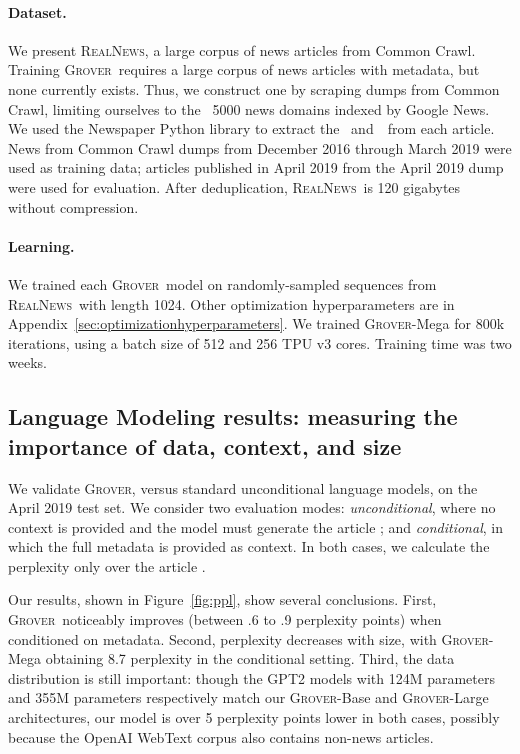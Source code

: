 \documentclass{article}
\newcommand{\modelname}{{\textsc{Grover}}}
\newcommand{\datasetname}{{\textsc{RealNews}}}
\begin{document}
\paragraph{Dataset.} We present \datasetname, a large corpus of news articles from Common Crawl. Training \modelname~requires a large corpus of news articles with metadata, but none currently exists. Thus, we construct one by scraping dumps from Common Crawl, limiting ourselves to the ~5000 news domains indexed by Google News. We used the Newspaper Python library to extract the \bodyfield~and~\metadata~from each article. News from Common Crawl dumps from December 2016 through March 2019 were used as training data; articles published in April 2019 from the April 2019 dump were used for evaluation. After deduplication, \datasetname~is 120 gigabytes without compression.


\paragraph{Learning.} We trained each \modelname~model on randomly-sampled sequences from \datasetname~with length 1024. Other optimization hyperparameters are in Appendix~\ref{sec:optimizationhyperparameters}. We trained \modelname-Mega for 800k iterations, using a batch size of 512 and 256 TPU v3 cores.
Training time was two weeks.

\subsection{Language Modeling results: measuring the importance of data, context, and size}
We validate \modelname, versus standard unconditional language models, on the  April 2019 test set. We consider two evaluation modes: \emph{unconditional}, where no context is provided and the model must generate the article \bodyfield; and \emph{conditional}, in which the full metadata is provided as context. In both cases, we calculate the perplexity only over the article \bodyfield.

Our results, shown in Figure~\ref{fig:ppl}, show several conclusions. First, \modelname~noticeably improves (between .6 to .9 perplexity points) when conditioned on metadata. Second, perplexity decreases with size, with \modelname-Mega obtaining 8.7 perplexity in the conditional setting. Third, the data distribution is still important: though the GPT2 models with 124M parameters and 355M parameters respectively match our \modelname-Base and \modelname-Large architectures, our model is over 5 perplexity points lower in both cases, possibly because the OpenAI WebText corpus also contains non-news articles.
\end{document}
